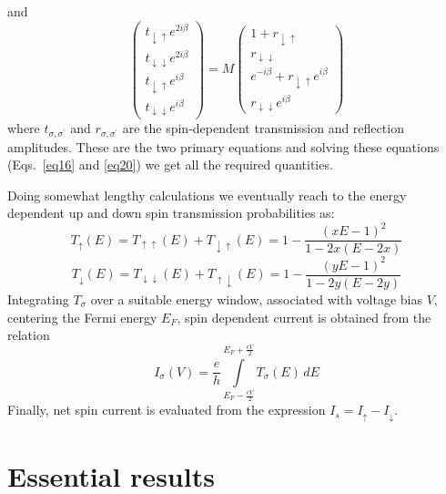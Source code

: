 \documentclass[doublecol]{epl2}
\begin{document}
and 
\begin{equation}
\left(\begin{array}{cc}
    t_{\downarrow\uparrow}e^{2 i \beta} \\
    t_{\downarrow\downarrow} e^{2 i \beta}\\ 
    t_{\downarrow\uparrow}e^{i \beta} \\
    t_{\downarrow\downarrow} e^{i \beta}
\end{array}\right)
=M\left(\begin{array}{cc}
    1 + r_{\downarrow\uparrow} \\
    r_{\downarrow\downarrow}\\
    e^{-i\beta} + r_{\downarrow\uparrow} e^{i\beta}\\
    r_{\downarrow\downarrow} e^{i \beta}
\end{array}\right)
\label{eq20}
\end{equation}
where $t_{\sigma,\sigma^{\prime}}$ and $r_{\sigma,\sigma^{\prime}}$ are
the spin-dependent transmission and reflection amplitudes. These are the 
two primary equations and solving these equations (Eqs.~\ref{eq16} and 
\ref{eq20}) we get all the required quantities. 

Doing somewhat lengthy calculations we eventually reach to the energy 
dependent up and down spin transmission probabilities as:
\begin{equation}
T_{\uparrow}(E)=T_{\uparrow\uparrow}(E)+T_{\downarrow\uparrow}(E) 
=1-\frac{(xE-1)^2}{1- 2x(E-2x)}
\label{eq2}
\end{equation}
\begin{equation}
T_{\downarrow}(E)=T_{\downarrow\downarrow}(E)+T_{\uparrow\downarrow}(E) 
=1-\frac{(yE-1)^2}{1- 2y(E-2y)}
\label{eq3}
\end{equation}
Integrating $T_{\sigma}$ over a suitable energy window, associated with 
voltage bias $V$, centering the Fermi energy $E_F$, spin dependent current 
is obtained from the relation~\cite{datta1}
\begin{equation}
I_{\sigma}(V) = \frac{e}{h} \int\limits_{E_F-\frac{eV}{2}}^{E_F+
\frac{eV}{2}}T_{\sigma}(E) \, dE
\label{eq4}
\end{equation}
Finally, net spin current is evaluated from the expression 
$I_s = I_{\uparrow} - I_{\downarrow}$.

\section{Essential results}
\end{document}
